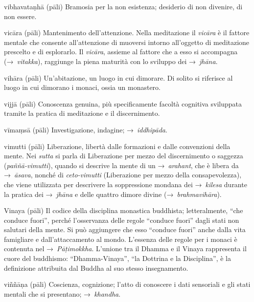 \begin{glossarydescription}
\item[vibhavataṇhā] (pāli) Bramosia per la non esistenza; desiderio di non
  divenire, di non essere.

\item[vicāra] (pāli) Mantenimento dell'attenzione. Nella meditazione il
  \emph{vicāra} è il fattore mentale che consente all'attenzione di muoversi
  intorno all'oggetto di meditazione prescelto e di esplorarlo. Il
  \emph{vicāra}, assieme al fattore che a esso si accompagna (→~\emph{vitakka}),
  raggiunge la piena maturità con lo sviluppo dei →~\emph{jhāna}.

\item[vihāra] (pāli) Un'abitazione, un luogo in cui dimorare. Di solito si
  riferisce al luogo in cui dimorano i monaci, ossia un monastero.

\item[vijjā] (pāli) Conoscenza genuina, più specificamente facoltà cognitiva
  sviluppata tramite la pratica di meditazione e il discernimento.

\item[vīmaṃsā] (pāli) Investigazione, indagine; →~\emph{iddhipāda}.

\item[vimutti] (pāli) Liberazione, libertà dalle formazioni e dalle convenzioni
  della mente. Nei \emph{sutta} si parla di Liberazione per mezzo del
  discernimento o saggezza (\emph{paññā-vimutti}), quando si descrive la mente
  di un →~\emph{arahant}, che è libera da →~\emph{āsava}, nonché di
  \emph{ceto-vimutti} (Liberazione per mezzo della consapevolezza), che viene
  utilizzata per descrivere la soppressione mondana dei →~\emph{kilesa} durante
  la pratica dei →~\emph{jhāna} e delle quattro dimore divine
  (→~\emph{brahmavihāra}).

\item[Vinaya] (pāli) Il codice della disciplina monastica buddhista;
  letteralmente, ``che conduce fuori'', perché l'osservanza delle regole
  ``conduce fuori'' dagli stati non salutari della mente. Si può aggiungere che
  esso ``conduce fuori'' anche dalla vita famigliare e dall'attaccamento al
  mondo. L'essenza delle regole per i monaci è contenuta nel
  →~\emph{Pāṭimokkha}. L'unione tra il Dhamma e il Vinaya rappresenta il cuore
  del buddhismo: ``Dhamma-Vinaya'', ``la Dottrina e la Disciplina'', è la
  definizione attribuita dal Buddha al suo stesso insegnamento.

\item[viññāṇa] (pāli) Coscienza, cognizione; l'atto di conoscere i dati
  sensoriali e gli stati mentali che si presentano; →~\emph{khandha}.


\end{glossarydescription}
